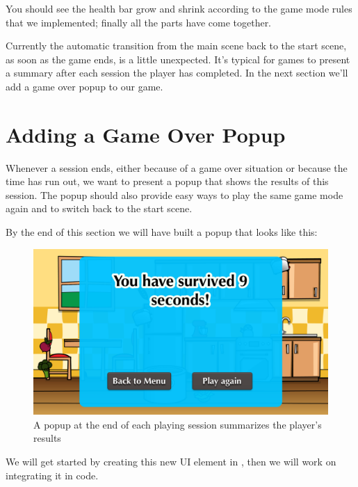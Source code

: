 You should see the health bar grow and shrink according to the game mode
rules that we implemented; finally all the parts have come together.

Currently the automatic transition from the main scene back to the start scene,
as soon as the game ends, is a little unexpected. It's typical for games to
present a summary after each session the player has completed. In the next section we'll add a game over
popup to our game.

\section{Adding a Game Over Popup}
Whenever a session ends, either because of a game over situation or because the
time has run out, we want to present a popup that shows the results of this
session. The popup should also provide easy ways to play the same game mode
again and to switch back to the start scene.

By the end of this section we will have built a popup that looks like this:
\begin{figure}[H]
    \centering
    \includegraphics[width=0.5\linewidth]{images/Chapter7/game_over_popup.png}
    \caption{A popup at the end of each playing session summarizes the player's
    results}\label{fig: gameover_popup}
\end{figure}

We will get started by creating this new UI element in \SB{}, then we will work
on integrating it in code.

